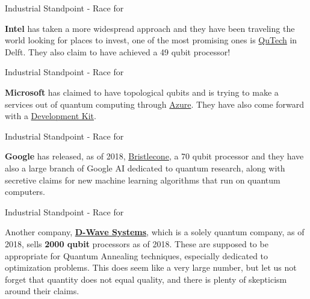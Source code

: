 \documentclass[aspectratio=43]{beamer}
\begin{document}
\begin{frame}{Industrial Standpoint - Race for \q}
    \begin{card}
        \textbf{Intel} has taken a more widespread approach and they have been traveling the world looking for places to invest, one of the most promising ones is \href{https://qutech.nl/}{QuTech} in Delft. They also claim to have achieved a 49 qubit processor!
    \end{card}
\pagenumber
\end{frame}

\begin{frame}{Industrial Standpoint - Race for \q}
    \begin{card}
        \textbf{Microsoft} has claimed to have topological qubits and is trying to make a services out of quantum computing through \href{https://azure.microsoft.com/en-us/}{Azure}. They have also come forward with a \href{https://www.microsoft.com/en-us/quantum/development-kit}{\q Development Kit}.
    \end{card}
\pagenumber
\end{frame}


\begin{frame}{Industrial Standpoint - Race for \q}
    \begin{card}
        \textbf{Google} has released, as of 2018, \href{https://techcrunch.com/2018/03/05/googles-new-bristlecone-processor-brings-it-one-step-closer-to-quantum-supremacy/}{Bristlecone}, a 70 qubit processor and they have also a large branch of Google AI dedicated to quantum research, along with secretive claims for new machine learning algorithms that run on quantum computers.
    \end{card}
\pagenumber
\end{frame}


\begin{frame}{Industrial Standpoint - Race for \q}
    \begin{card}
        Another company, \href{https://www.dwavesys.com/quantum-computing}{\textbf{D-Wave Systems}}, which is a solely quantum company, as of 2018, sells \textbf{2000 qubit} processors as of 2018. These are supposed to be appropriate for Quantum Annealing techniques, especially dedicated to optimization problems. This does seem like a very large number, but let us not forget that quantity does not equal quality, and there is plenty of skepticism around their claims.
    \end{card}
\pagenumber
\end{frame}
\end{document}
